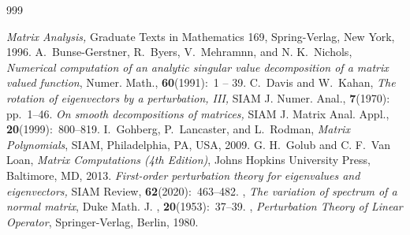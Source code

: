 \documentclass[11pt,a4paper]{article}
\numberwithin{equation}{section}
\begin{document}
\begin{thebibliography}{999}

%
 {\it Matrix Analysis,} Graduate Texts in Mathematics 169, Spring-Verlag, New York, 1996.
%
 {\sc A.~Bunse-Gerstner, R.~Byers, V.~Mehramnn, and N. K.~Nichols,} {\it Numerical computation of an analytic singular value decomposition of a matrix valued function},
Numer. Math., {\bf 60}(1991):~1 -- 39.
%
%
%
%
%
 {\sc C.~Davis and W.~Kahan}, {\it The rotation of eigenvectors by a perturbation, III,} SIAM J. Numer. Anal., {\bf 7}(1970): pp.~1--46.
%
 {\it On smooth decompositions of matrices,} SIAM J. Matrix Anal. Appl., {\bf 20}(1999):~800--819.
%
 {\sc I.~Gohberg, P.~Lancaster, and L.~Rodman}, {\it Matrix Polynomials}, SIAM, Philadelphia, PA, USA, 2009.
%
 {\sc G. H.~Golub and C. F.~Van Loan}, {\it Matrix Computations (4th Edition)}, Johns Hopkins University Press, Baltimore, MD, 2013.
%
 {\it First-order perturbation theory for eigenvalues and eigenvectors,} SIAM Review, {\bf 62}(2020):~463--482.
%
, {\it The variation of spectrum of a normal matrix}, Duke Math. J. , {\bf 20}(1953):~37--39.
%
, {\it Perturbation Theory of Linear Operator}, Springer-Verlag, Berlin, 1980.
%
%

\end{thebibliography}
\end{document}

